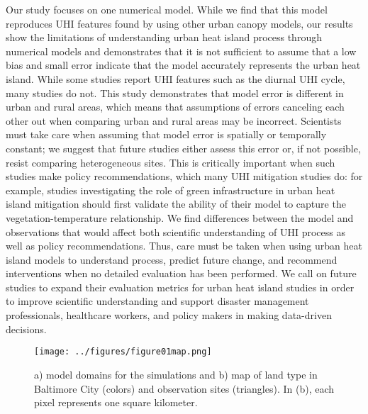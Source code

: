 \documentclass[draft,linenumbers]{agujournal}
\begin{document}
Our study focuses on one numerical model. While we find that this model reproduces UHI features found by using other urban canopy models, our results show the limitations of understanding urban heat island process through numerical models and demonstrates that it is not sufficient to assume that a low bias and small error indicate that the model accurately represents the urban heat island.  
While some studies report UHI features such as the diurnal UHI cycle, many studies do not. 
This study demonstrates that model error is different in urban and rural areas, which means that assumptions of errors canceling each other out when comparing urban and rural areas may be incorrect. Scientists must take care when assuming that model error is spatially or temporally constant; we suggest that future studies either assess this error or, if not possible, resist comparing heterogeneous sites. This is critically important when such studies make policy recommendations, which many UHI mitigation studies do: for example, studies investigating the role of green infrastructure in urban heat island mitigation should first validate the ability of their model to capture the vegetation-temperature relationship. 
We find differences between the model and observations that would affect both scientific understanding of UHI process as well as policy recommendations. 
Thus, care must be taken when using urban heat island models to understand process, predict future change, and recommend interventions when no detailed evaluation has been performed. We call on future studies to expand their evaluation metrics for urban heat island studies in order to improve scientific understanding and support disaster management professionals, healthcare workers, and policy makers in making data-driven decisions. 





%
%
%
%
\begin{figure}[h]
\centering
\texttt{[image: ../figures/figure01map.png]}
\caption{a) model domains for the simulations and b) map of land type in Baltimore City (colors) and observation sites (triangles). In (b), each pixel represents one square kilometer.}
\label{fig:map}
 \end{figure}
 
\end{document}
